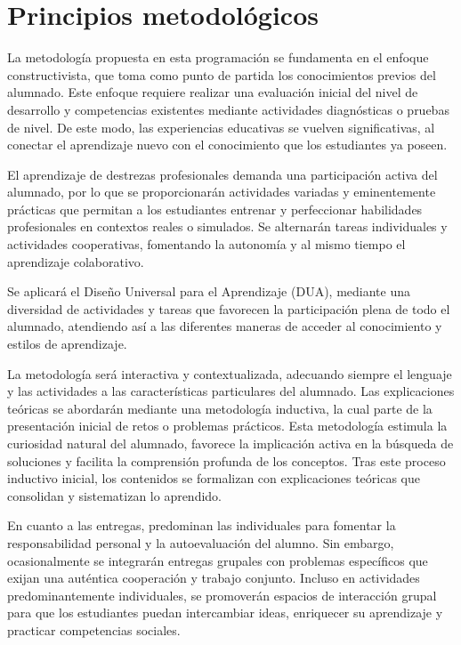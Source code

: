 \section{Principios metodológicos}

La metodología propuesta en esta programación se fundamenta en el enfoque constructivista, que toma como punto de partida los conocimientos previos del alumnado. Este enfoque requiere realizar una evaluación inicial del nivel de desarrollo y competencias existentes mediante actividades diagnósticas o pruebas de nivel. De este modo, las experiencias educativas se vuelven significativas, al conectar el aprendizaje nuevo con el conocimiento que los estudiantes ya poseen.

El aprendizaje de destrezas profesionales demanda una participación activa del alumnado, por lo que se proporcionarán actividades variadas y eminentemente prácticas que permitan a los estudiantes entrenar y perfeccionar habilidades profesionales en contextos reales o simulados. Se alternarán tareas individuales y actividades cooperativas, fomentando la autonomía y al mismo tiempo el aprendizaje colaborativo.

Se aplicará el  Diseño Universal para el Aprendizaje (DUA), mediante una diversidad de actividades y tareas que favorecen la participación plena de todo el alumnado, atendiendo así a las diferentes maneras de acceder al conocimiento y estilos de aprendizaje.

La metodología será interactiva y contextualizada, adecuando siempre el lenguaje y las actividades a las características particulares del alumnado. Las explicaciones teóricas se abordarán mediante una metodología inductiva, la cual parte de la presentación inicial de retos o problemas prácticos. Esta metodología estimula la curiosidad natural del alumnado, favorece la implicación activa en la búsqueda de soluciones y facilita la comprensión profunda de los conceptos. Tras este proceso inductivo inicial, los contenidos se formalizan con explicaciones teóricas que consolidan y sistematizan lo aprendido.

En cuanto a las entregas, predominan las individuales para fomentar la responsabilidad personal y la autoevaluación del alumno. Sin embargo, ocasionalmente se integrarán entregas grupales con problemas específicos que exijan una auténtica cooperación y trabajo conjunto. Incluso en actividades predominantemente individuales, se promoverán espacios de interacción grupal para que los estudiantes puedan intercambiar ideas, enriquecer su aprendizaje y practicar competencias sociales.

